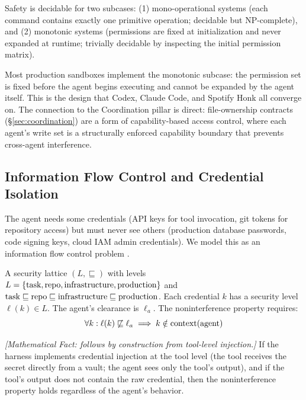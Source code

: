 \begin{corollary}
\label{cor:decidable-sec}
Safety is decidable for two subcases: (1) mono-operational systems (each command contains exactly one primitive operation; decidable but NP-complete), and (2) monotonic systems (permissions are fixed at initialization and never expanded at runtime; trivially decidable by inspecting the initial permission matrix).
\end{corollary}

Most production sandboxes implement the monotonic subcase: the permission set is fixed before the agent begins executing and cannot be expanded by the agent itself. This is the design that Codex, Claude Code, and Spotify Honk all converge on. The connection to the Coordination pillar is direct: file-ownership contracts (\S\ref{sec:coordination}) are a form of capability-based access control, where each agent's write set is a structurally enforced capability boundary that prevents cross-agent interference.

\subsection{Information Flow Control and Credential Isolation}

The agent needs some credentials (API keys for tool invocation, git tokens for repository access) but must never see others (production database passwords, code signing keys, cloud IAM admin credentials). We model this as an information flow control problem \citep{denning1976lattice}.

\begin{definition}
\label{def:sec-lattice}
A security lattice $(L, \sqsubseteq)$ with levels $L = \{\textup{task}, \textup{repo}, \textup{infrastructure}, \textup{production}\}$ and $\textup{task} \sqsubseteq \textup{repo} \sqsubseteq \textup{infrastructure} \sqsubseteq \textup{production}$. Each credential $k$ has a security level $\ell(k) \in L$. The agent's clearance is $\ell_a$. The noninterference property requires:
\begin{equation}
\forall k: \ell(k) \not\sqsubseteq \ell_a \implies k \notin \textup{context}(\textup{agent})
\end{equation}
\end{definition}

\begin{theorem}
\emph{[Mathematical Fact: follows by construction from tool-level injection.]}
\label{thm:noninterference-sec}
If the harness implements credential injection at the tool level (the tool receives the secret directly from a vault; the agent sees only the tool's output), and if the tool's output does not contain the raw credential, then the noninterference property holds regardless of the agent's behavior.
\end{theorem}

